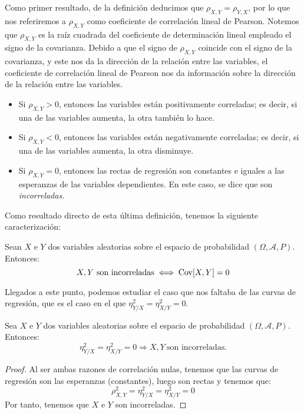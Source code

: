 Como primer resultado, de la definición deducimos que $\rho_{X,Y}=\rho_{Y,X}$, por lo que nos referiremos a $\rho_{X,Y}$ como coeficiente de correlación lineal de Pearson.
Notemos que $\rho_{X,Y}$ es la raíz cuadrada del coeficiente de determinación lineal empleado el signo de la covarianza. Debido a que el signo de $\rho_{X,Y}$ coincide con el signo de la covarianza, y este nos da la dirección de la relación entre las variables, el coeficiente de correlación lineal de Pearson nos da información sobre la dirección de la relación entre las variables.
\begin{itemize}
    \item Si $\rho_{X,Y}>0$, entonces las variables están positivamente correladas; es decir, si una de las variables aumenta, la otra también lo hace.
    \item Si $\rho_{X,Y}<0$, entonces las variables están negativamente correladas; es decir, si una de las variables aumenta, la otra disminuye.
    \item Si $\rho_{X,Y}=0$, entonces las rectas de regresión son constantes e iguales a las esperanzas de las variables dependientes. En este caso, se dice que son \emph{incorreladas}.
\end{itemize}

Como resultado directo de esta última definición, tenemos la siguiente caracterización:
\begin{prop}
    Sean $X$ e $Y$ dos variables aleatorias sobre el espacio de probabilidad $(\Omega, \mathcal{A}, P)$. Entonces:
    \begin{equation*}
        X,Y\ \text{son incorreladas} \iff \operatorname{Cov}[X,Y] = 0
    \end{equation*}
\end{prop}

Llegados a este punto, podemos estudiar el caso que nos faltaba de las curvas de regresión, que es el caso en el que $\eta_{Y/X}^2 = \eta_{X/Y}^2 = 0$.
\begin{prop}
    Sea $X$ e $Y$ dos variables aleatorias sobre el espacio de probabilidad $(\Omega, \mathcal{A}, P)$. Entonces:
    \begin{equation*}
        \eta_{Y/X}^2 = \eta_{X/Y}^2 = 0 \Longrightarrow X,Y\ \text{son incorreladas.}
    \end{equation*}
\end{prop}
\begin{proof}
    Al ser ambas razones de correlación nulas, tenemos que las curvas de regresión son las esperanzas (constantes), luego son rectas y tenemos que:
    \begin{equation*}
        \rho_{X,Y}^2 = \eta_{Y/X}^2 = \eta_{X/Y}^2 = 0
    \end{equation*}
    Por tanto, tenemos que $X$ e $Y$ son incorreladas.
\end{proof}

